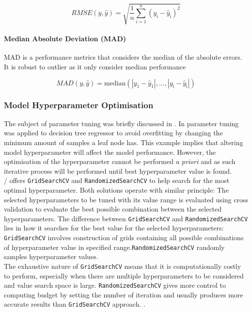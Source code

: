 \begin{equation}\label{eqn:RMSE}
    RMSE(y,\hat{y}) = \sqrt{\frac{1}{n}\sum_{i=1}^{n} (y_{\text{i}} - \hat{y}_{\text{i}})^2} 
\end{equation}

\paragraph{Median Absolute Deviation (MAD)}\label{MAD} 

MAD is a performance metrics that considers the median of the absolute errors. It is robust to outlier as it only consider median performance

\begin{equation}\label{eqn:MAD}
    MAD(y,\hat{y}) =  \text{median} (|y_{\text{1}} - \hat{y}_{\text{1}}|,\dots,|y_{\text{i}} - \hat{y}_{\text{i}}|)
\end{equation}


\subsubsection{Model Hyperparameter Optimisation}\label{hpo}

The subject of parameter tuning was briefly discussed in . In  parameter tuning was applied to decision tree regressor to avoid overfitting by changing the minimum amount of samples a leaf node has. This example implies that altering model hyperparameter will affect the model performance. However, the optimisation of the hyperparameter cannot be performed \emph{a priori} and as such iterative process will be performed until best hyperparameter value is found.\\ 

\scikit/ offers {\tt GridSearchCV} and {\tt RandomizedSearchCV} to help search for the most optimal hyperparameter. Both solutions operate with similar principle: The selected hyperparameters to be tuned with its value range is evaluated using cross validation to evaluate the best possible combination between the selected hyperparameters. The difference between {\tt GridSearchCV} and {\tt RandomizedSearchCV} lies in how it searches for the best value for the selected hyperparameters: {\tt GridSearchCV} involves construction of grids containing all possible combinations of hyperparameter value in specified range.{\tt RandomizedSearchCV} randomly samples hyperparameter values.\\ 

The exhaustive nature of {\tt GridSearchCV} means that it is computationally costly to perform, especially when there are multiple hyperparameters to be considered and value search space is large. {\tt RandomizedSearchCV} gives more control to computing budget by setting the number of iteration and usually produces more accurate results than {\tt GridSearchCV} approach. \cite{Geron.2019,J.Bergstra.2012}. \\

